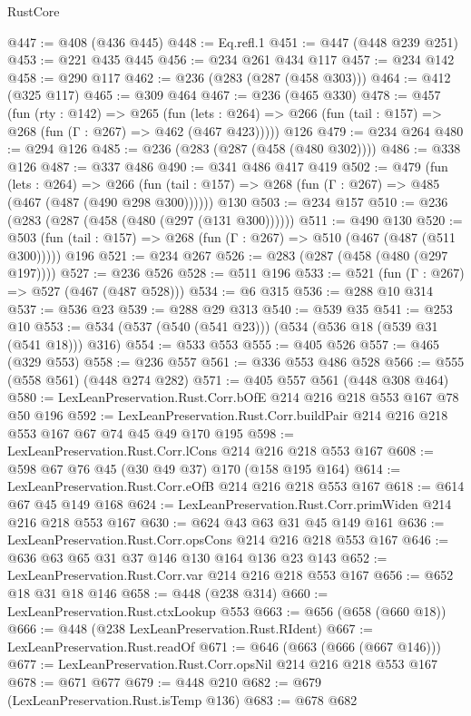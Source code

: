 \begin{lexlean}{RustCore}
\begin{coremodule}
@447 := @408 (@436 @445)
@448 := Eq.refl.{1}
@451 := @447 (@448 @239 @251)
@453 := @221 @435 @445
@456 := @234 @261 @434 @117
@457 := @234 @142
@458 := @290 @117
@462 := @236 (@283 (@287 (@458 @303)))
@464 := @412 (@325 @117)
@465 := @309 @464
@467 := @236 (@465 @330)
@478 := @457
    (fun (rty : @142) =>
    @265
      (fun (lets : @264) => @266 (fun (tail : @157) => @268 (fun (Γ : @267) => @462 (@467 @423)))))
    @126
@479 := @234 @264
@480 := @294 @126
@485 := @236 (@283 (@287 (@458 (@480 @302))))
@486 := @338 @126
@487 := @337 @486
@490 := @341 @486 @417 @419
@502 := @479
    (fun (lets : @264) =>
    @266 (fun (tail : @157) => @268 (fun (Γ : @267) => @485 (@467 (@487 (@490 @298 @300))))))
    @130
@503 := @234 @157
@510 := @236 (@283 (@287 (@458 (@480 (@297 (@131 @300))))))
@511 := @490 @130
@520 := @503 (fun (tail : @157) => @268 (fun (Γ : @267) => @510 (@467 (@487 (@511 @300))))) @196
@521 := @234 @267
@526 := @283 (@287 (@458 (@480 (@297 @197))))
@527 := @236 @526
@528 := @511 @196
@533 := @521 (fun (Γ : @267) => @527 (@467 (@487 @528)))
@534 := @6 @315
@536 := @288 @10 @314
@537 := @536 @23
@539 := @288 @29 @313
@540 := @539 @35
@541 := @253 @10
@553 := @534 (@537 (@540 (@541 @23))) (@534 (@536 @18 (@539 @31 (@541 @18))) @316)
@554 := @533 @553
@555 := @405 @526
@557 := @465 (@329 @553)
@558 := @236 @557
@561 := @336 @553 @486 @528
@566 := @555 (@558 @561) (@448 @274 @282)
@571 := @405 @557 @561 (@448 @308 @464)
@580 := LexLeanPreservation.Rust.Corr.bOfE @214 @216 @218 @553 @167 @78 @50 @196
@592 := LexLeanPreservation.Rust.Corr.buildPair @214 @216 @218 @553 @167 @67 @74 @45 @49 @170 @195
@598 := LexLeanPreservation.Rust.Corr.lCons @214 @216 @218 @553 @167
@608 := @598 @67 @76 @45 (@30 @49 @37) @170 (@158 @195 @164)
@614 := LexLeanPreservation.Rust.Corr.eOfB @214 @216 @218 @553 @167
@618 := @614 @67 @45 @149 @168
@624 := LexLeanPreservation.Rust.Corr.primWiden @214 @216 @218 @553 @167
@630 := @624 @43 @63 @31 @45 @149 @161
@636 := LexLeanPreservation.Rust.Corr.opsCons @214 @216 @218 @553 @167
@646 := @636 @63 @65 @31 @37 @146 @130 @164 @136 @23 @143
@652 := LexLeanPreservation.Rust.Corr.var @214 @216 @218 @553 @167
@656 := @652 @18 @31 @18 @146
@658 := @448 (@238 @314)
@660 := LexLeanPreservation.Rust.ctxLookup @553
@663 := @656 (@658 (@660 @18))
@666 := @448 (@238 LexLeanPreservation.Rust.RIdent)
@667 := LexLeanPreservation.Rust.readOf
@671 := @646 (@663 (@666 (@667 @146)))
@677 := LexLeanPreservation.Rust.Corr.opsNil @214 @216 @218 @553 @167
@678 := @671 @677
@679 := @448 @210
@682 := @679 (LexLeanPreservation.Rust.isTemp @136)
@683 := @678 @682

\end{coremodule}
\end{lexlean}
